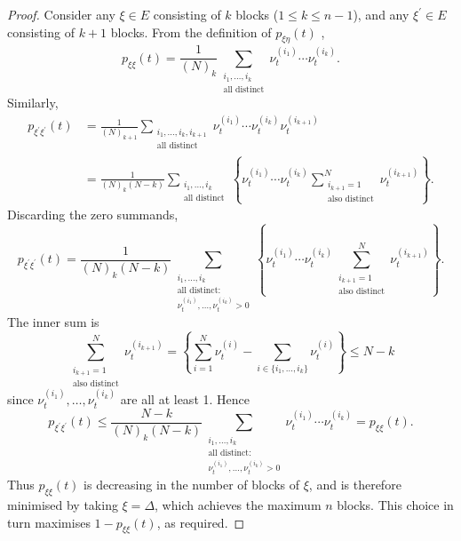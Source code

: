 \documentclass{article}
\newcommand{\1}[1]{\mathbb{I}_{#1}}
\begin{document}
\begin{proof}
Consider any $\xi \in E$ consisting of $k$ blocks ($1\leq k\leq n-1$), and any $\xi^\prime\in E$ consisting of $k+1$ blocks. 
From the definition of $p_{\xi\eta}(t)$ \citep[Equation (1)]{koskela2018},
\begin{equation}
p_{\xi\xi}(t) = \frac{1}{(N)_k} \sum_{\substack{i_1,\dots,i_k \\ \text{all distinct}}} \nu_t^{(i_1)} \cdots \nu_t^{(i_k)} .
\end{equation}
Similarly,
\begin{align*}
p_{\xi^\prime\xi^\prime}(t) &= \frac{1}{(N)_{k+1}} \sum_{\substack{i_1,\dots,i_k, i_{k+1} \\ \text{all distinct}}} \nu_t^{(i_1)} \cdots \nu_t^{(i_k)} \nu_t^{(i_{k+1})} \\
&= \frac{1}{(N)_k(N-k)} \sum_{\substack{i_1,\dots,i_k \\ \text{all distinct}}} \left\{ \nu_t^{(i_1)} \cdots \nu_t^{(i_k)} \sum_{\substack{i_{k+1}=1 \\ \text{also distinct}}}^N \nu_t^{(i_{k+1})} \right\} .
\end{align*}
Discarding the zero summands,
\begin{equation}
p_{\xi^\prime\xi^\prime}(t) = \frac{1}{(N)_k(N-k)} \sum_{\substack{i_1,\dots,i_k \\ \text{all distinct:} \\ \nu_t^{(i_1)},\dots,\nu_t^{(i_k)} > 0 }} \left\{ \nu_t^{(i_1)} \cdots \nu_t^{(i_k)} \sum_{\substack{i_{k+1}=1 \\ \text{also distinct}}}^N \nu_t^{(i_{k+1})} \right\} .
\end{equation}
The inner sum is
\begin{equation}
\sum_{\substack{i_{k+1}=1 \\ \text{also distinct}}}^N \nu_t^{(i_{k+1})} =
\left\{ \sum_{i=1}^N \nu_t^{(i)} -  \sum_{i\in\{i_1,\dots,i_k\} } \nu_t^{(i)} \right\}
\leq N - k
\end{equation}
since $\nu_t^{(i_1)},\dots,\nu_t^{(i_k)} $ are all at least 1.
Hence
\begin{equation}
p_{\xi^\prime\xi^\prime}(t)
\leq  \frac{N-k}{(N)_k(N-k)} \sum_{\substack{i_1,\dots,i_k \\ \text{all distinct:} \\ \nu_t^{(i_1)},\dots,\nu_t^{(i_k)} > 0 }} \nu_t^{(i_1)} \cdots \nu_t^{(i_k)} 
= p_{\xi\xi}(t) .
\end{equation}
Thus $p_{\xi\xi}(t)$ is decreasing in the number of blocks of $\xi$, and is therefore minimised by taking $\xi = \Delta$, which achieves the maximum $n$ blocks. This choice in turn maximises $1-p_{\xi\xi}(t)$, as required.
\end{proof}
\end{document}
